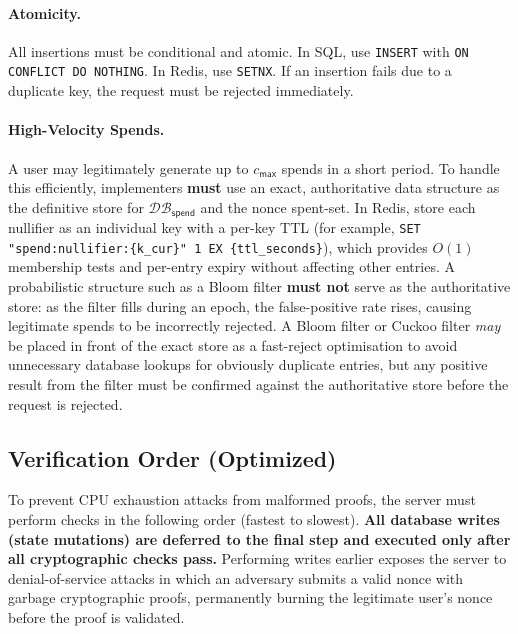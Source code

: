 \documentclass[11pt]{article}
\theoremstyle{definitionstyle}
\theoremstyle{plain}
\newcommand{\DB}{\mathcal{DB}}
\begin{document}
\paragraph{Atomicity.}
All insertions must be conditional and atomic. In SQL, use \texttt{INSERT} with \texttt{ON CONFLICT DO NOTHING}. In Redis, use \texttt{SETNX}. If an insertion fails due to a duplicate key, the request must be rejected immediately.

\paragraph{High-Velocity Spends.}
A user may legitimately generate up to $c_{\mathsf{max}}$ spends in a short period. To handle this efficiently, implementers \textbf{must} use an exact, authoritative data structure as the definitive store for $\DB_{\mathsf{spend}}$ and the nonce spent-set. In Redis, store each nullifier as an individual key with a per-key TTL (for example, \verb|SET "spend:nullifier:{k_cur}" 1 EX {ttl_seconds}|), which provides $O(1)$ membership tests and per-entry expiry without affecting other entries. A probabilistic structure such as a Bloom filter \textbf{must not} serve as the authoritative store: as the filter fills during an epoch, the false-positive rate rises, causing legitimate spends to be incorrectly rejected. A Bloom filter or Cuckoo filter \emph{may} be placed in front of the exact store as a fast-reject optimisation to avoid unnecessary database lookups for obviously duplicate entries, but any positive result from the filter must be confirmed against the authoritative store before the request is rejected.

\subsection{Verification Order (Optimized)}

To prevent CPU exhaustion attacks from malformed proofs, the server must perform checks in the following order (fastest to slowest). \textbf{All database writes (state mutations) are deferred to the final step and executed only after all cryptographic checks pass.} Performing writes earlier exposes the server to denial-of-service attacks in which an adversary submits a valid nonce with garbage cryptographic proofs, permanently burning the legitimate user's nonce before the proof is validated.
\end{document}
